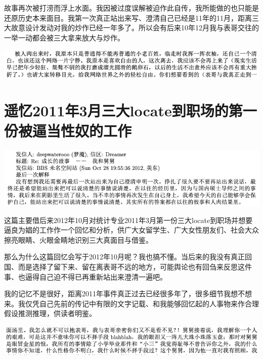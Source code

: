 \documentclass[9pt, b5paper]{article}
\begin{document}
故事再次被打涝而浮上水面。我因被过度误解被迫作此自传，我所能做的也只能是还原历史本来面目。我第一次真正站出来写、澄清自己已经是11年的11月，距离三大故意设计发动对我的炒作已经一年多了。所以会有后来10年12月我与表哥交往的一举一动都会被三大拿来放大与炒作。 

\begin{center}
\includegraphics[width=.9\linewidth]{./pic/p1p165.png}
\end{center}

\section{遥忆2011年3月三大locate到职场的第一份被逼当性奴的工作}
\label{sec:orga7bd32d}

\begin{center}
\includegraphics[width=.9\linewidth]{./pic/backups_plans_p1p143-1.png.png}
\end{center}

这篇主要借后来2012年10月对统计专业2011年3月第一份三大locate到职场并想要逼良为娼的工作作一个回忆和分析，供广大女留学生、广大女性朋友们、社会大众擦亮眼睛、火眼金睛地识别三大真面目与借鉴。

那么为什么这篇回忆会写于2012年10月呢？我也搞不懂。当后来的我没有真正回国、而是选择了留下来、留在离表哥不远的地方，可能舆论也有回刍来反思这件事、也逼得自己迫不得已再重新站出来澄清一遍吧。

我的记忆不是很好，距离2011年事件真正过去已经很多年了，很多细节我想不想来。我仅凭自己先前的传记中有限的文字记载、和我能够回忆起的人事物来作合理假设推测推理，供读者明鉴。

\begin{center}
\includegraphics[width=.9\linewidth]{./pic/backups_plans_20210412_103658.png}
\end{center}
\end{document}

